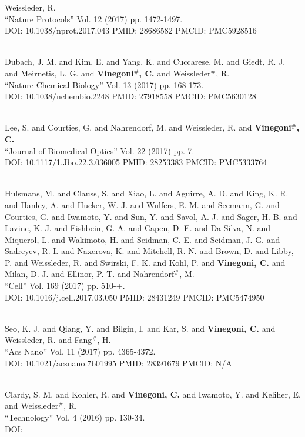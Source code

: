 Weissleder, R. \\ ``Nature Protocols'' Vol. 12 (2017) pp. 1472-1497. \\ DOI: 10.1038/nprot.2017.043 PMID: 28686582 PMCID: PMC5928516\item {} \\ Dubach, J. M. and Kim, E. and Yang, K. and Cuccarese, M. and Giedt, R. J. and Meirnetis, L. G. and {\bf Vinegoni$^\#$, C.} and Weissleder$^\#$, R. \\ ``Nature Chemical Biology'' Vol. 13 (2017) pp. 168-173. \\ DOI: 10.1038/nchembio.2248 PMID: 27918558 PMCID: PMC5630128\item {} \\ Lee, S. and Courties, G. and Nahrendorf, M. and Weissleder, R. and {\bf Vinegoni$^\#$, C.} \\ ``Journal of Biomedical Optics'' Vol. 22 (2017) pp. 7. \\ DOI: 10.1117/1.Jbo.22.3.036005 PMID: 28253383 PMCID: PMC5333764\item {} \\ Hulsmans, M. and Clauss, S. and Xiao, L. and Aguirre, A. D. and King, K. R. and Hanley, A. and Hucker, W. J. and Wulfers, E. M. and Seemann, G. and Courties, G. and Iwamoto, Y. and Sun, Y. and Savol, A. J. and Sager, H. B. and Lavine, K. J. and Fishbein, G. A. and Capen, D. E. and Da Silva, N. and Miquerol, L. and Wakimoto, H. and Seidman, C. E. and Seidman, J. G. and Sadreyev, R. I. and Naxerova, K. and Mitchell, R. N. and Brown, D. and Libby, P. and Weissleder, R. and Swirski, F. K. and Kohl, P. and {\bf Vinegoni, C.} and Milan, D. J. and Ellinor, P. T. and Nahrendorf$^\#$, M. \\ ``Cell'' Vol. 169 (2017) pp. 510-+. \\ DOI: 10.1016/j.cell.2017.03.050 PMID: 28431249 PMCID: PMC5474950\item {} \\ Seo, K. J. and Qiang, Y. and Bilgin, I. and Kar, S. and {\bf Vinegoni, C.} and Weissleder, R. and Fang$^\#$, H. \\ ``Acs Nano'' Vol. 11 (2017) pp. 4365-4372. \\ DOI: 10.1021/acsnano.7b01995 PMID: 28391679 PMCID: N/A\item {} \\ Clardy, S. M. and Kohler, R. and {\bf Vinegoni, C.} and Iwamoto, Y. and Keliher, E. and Weissleder$^\#$, R. \\ ``Technology'' Vol. 4 (2016) pp. 130-34. \\ DOI: 